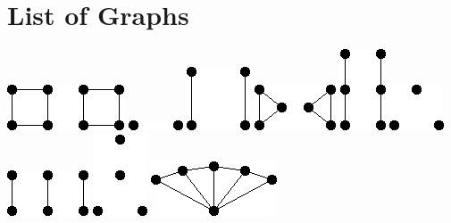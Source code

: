 \documentclass[11pt,paper=b5,footinclude,headinclude]{scrbook} %
\theoremstyle{remark}
\theoremstyle{definition} %
\theoremstyle{theorem} %
\begin{document}
\chapter{List of Graphs}
\label{ch:listofGraphs}
  	\centering
  	\includegraphics[scale=0.5,frame]{smallGraphs/g_2C4.png}     
\includegraphics[scale=0.5,frame]{smallGraphs/g_2K1.png}     
\includegraphics[scale=0.5,frame]{smallGraphs/g_2K2.png}     
\includegraphics[scale=0.5,frame]{smallGraphs/g_2K3.png}     
\includegraphics[scale=0.5,frame]{smallGraphs/g_2P3.png}     
\includegraphics[scale=0.5,frame]{smallGraphs/g_3K1.png}     
\includegraphics[scale=0.5,frame]{smallGraphs/g_3K2.png}     
\includegraphics[scale=0.5,frame]{smallGraphs/g_4K1.png}     
\includegraphics[scale=0.5,frame]{smallGraphs/g_4fan.png}     
\end{document}

